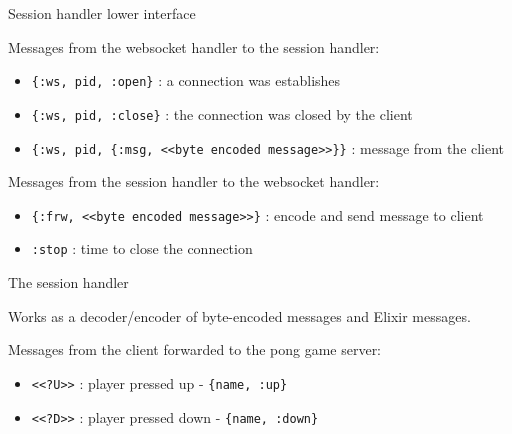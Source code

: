 \begin{frame}{Session handler lower interface}

Messages from the websocket handler to the session handler:

\vspace{10pt}  \pause

\begin{itemize}
\item {\tt \{:ws, pid, :open\}}  : a connection was establishes
\item {\tt \{:ws, pid, :close\}}  : the connection was closed by the client
\item {\tt \{:ws, pid, \{:msg,  <<byte encoded message>>\}\}} : message from the client
\end{itemize}

\vspace{10pt}  \pause

Messages from the session handler to the websocket handler:

\begin{itemize}
\item {\tt \{:frw, <<byte encoded message>>\}}  : encode and send message to client
\item {\tt :stop} : time to close the connection
\end{itemize}

\end{frame}

\begin{frame}{The session handler}

  Works as a decoder/encoder of byte-encoded  messages and Elixir messages.

  \vspace{20pt}  \pause

  Messages from the client forwarded to the pong game server:

  \vspace{20pt}

  \begin{itemize}
  \item {\tt <<?U>>}  : player pressed up -  {\tt \{name, :up\}}
  \item {\tt <<?D>>}  : player pressed down -  {\tt \{name, :down\}}        
  \end{itemize}


\end{frame}

